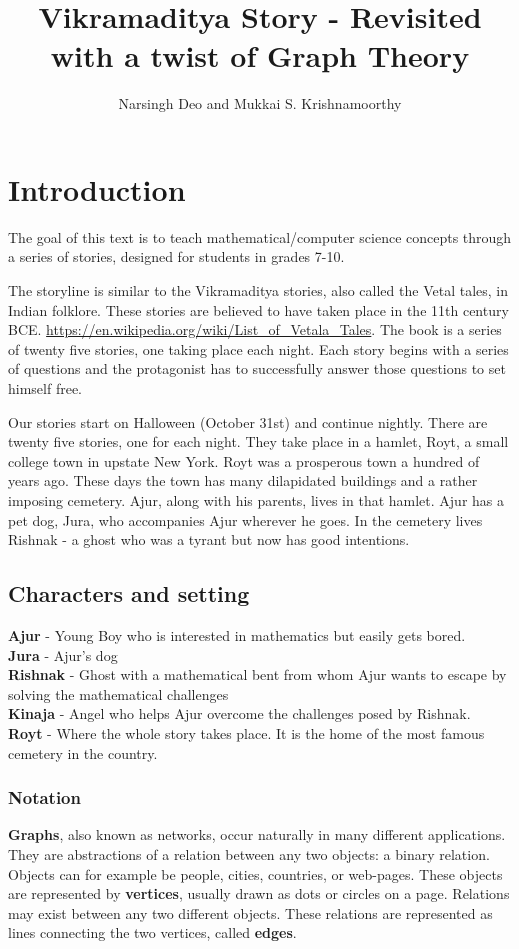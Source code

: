 \documentclass[ebook,12pt,oneside,openany]{memoir}
\title{Vikramaditya Story - Revisited with a twist of Graph Theory}
\author{Narsingh Deo and Mukkai S. Krishnamoorthy}
\begin{document}
\maketitle
\chapter{Introduction}
The goal of this text is to teach mathematical/computer science concepts through a series of stories, designed for  students in grades 7-10.

The storyline is similar to the Vikramaditya stories, also called the Vetal tales, in Indian folklore. These stories are believed to have taken place in the 11th century BCE. \url{https://en.wikipedia.org/wiki/List_of_Vetala_Tales}. The book is a series of twenty five stories, one taking place each night. Each story begins with a series of questions and the protagonist has to successfully answer those questions to set himself free. 


Our stories start on Halloween (October 31st) and continue nightly. There are twenty five stories, one for each night. They take place in a hamlet, Royt, a small college town in upstate New York. Royt was a prosperous town a hundred of years ago. These days the town has many dilapidated buildings and a rather imposing cemetery. Ajur, along with his parents, lives in that hamlet. Ajur has a pet dog, Jura, who accompanies Ajur wherever he goes.  In the cemetery lives Rishnak - a ghost who was a tyrant but now has good intentions.
\section{Characters and setting}

\textbf {Ajur} - Young Boy who is interested in mathematics but easily gets bored.\\
\noindent
 \textbf {Jura } - Ajur's dog\\
\noindent
\textbf{Rishnak} - Ghost with a mathematical bent from whom Ajur wants to escape by solving the mathematical challenges\\
\noindent
\textbf{Kinaja} - Angel who helps Ajur overcome the challenges posed by Rishnak.\\
\noindent
\textbf{Royt} - Where the whole story takes place. It is the home of the most famous cemetery in the country.

\begin{newpage}
\end{newpage}
\subsection{Notation}
\textbf{Graphs}, also known as networks, occur naturally in many different applications. They are abstractions of a relation between any two objects: a binary relation. Objects can for example be people, cities, countries, or web-pages. These objects are represented by \textbf{vertices}, usually drawn as dots or circles on a page. Relations may exist between any two different objects. These relations are represented as lines connecting the two vertices, called \textbf{edges}.
\end{document}
